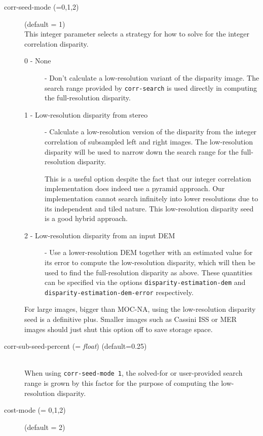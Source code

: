 \begin{description}
\item[corr-seed-mode \textnormal{\small{(=0,1,2)}}] (default = 1) \hfill \\
  This integer parameter selects a strategy for how to solve for the integer
  correlation disparity.
  \begin{description}
    \item[0 - None] - Don't calculate a low-resolution
      variant of the disparity image.
      The search range provided by \texttt{corr-search} is used directly in computing the
      full-resolution disparity.
    \item[1 - Low-resolution disparity from stereo] - Calculate a low-resolution version
      of the disparity from the integer correlation of subsampled left and right images.
      The low-resolution disparity will be used to narrow down the search range
      for the full-resolution disparity.

      This is a useful option despite the fact that our integer
      correlation implementation does indeed use a pyramid
      approach. Our implementation cannot search infinitely into lower
      resolutions due to its independent and tiled nature. This
      low-resolution disparity seed is a good hybrid approach.
    \item[2 - Low-resolution disparity from an input DEM] - Use a lower-resolution DEM together with an estimated
      value for its error to compute the low-resolution disparity, which will then be used
      to find the full-resolution disparity as above. These quantities
      can be specified via the options \texttt{disparity-estimation-dem}
      and  \texttt{disparity-estimation-dem-error} respectively.
  \end{description}

  For large images, bigger than MOC-NA, using the low-resolution
  disparity seed is a definitive plus. Smaller images such as Cassini
  ISS or MER images should just shut this option off to save storage
  space.

\item[corr-sub-seed-percent \textnormal{\small{(= \emph{float})}} (default=0.25)] \hfill \\
  When using \texttt{corr-seed-mode 1}, the solved-for or user-provided
  search range is grown by this factor for the purpose of computing the
  low-resolution disparity.

\item[cost-mode \textnormal{\small{(= 0,1,2)}}] (default = 2) \hfill \\


\end{description}
